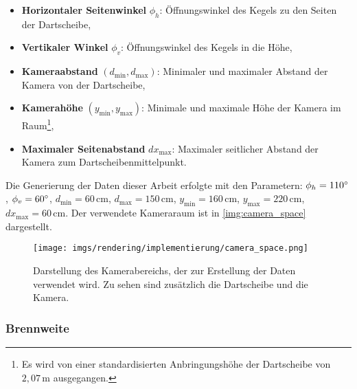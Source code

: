 \begin{itemize}
    \item \textbf{Horizontaler Seitenwinkel} $\phi_h$: Öffnungswinkel des Kegels zu den Seiten der Dartscheibe,
    \item \textbf{Vertikaler Winkel} $\phi_v$: Öffnungswinkel des Kegels in die Höhe,
    \item \textbf{Kameraabstand} $\left(d_\text{min}, d_\text{max}\right)$: Minimaler und maximaler Abstand der Kamera von der Dartscheibe,
    \item \textbf{Kamerahöhe} $\left(y_\text{min}, y_\text{max}\right)$: Minimale und maximale Höhe der Kamera im Raum\footnote{Es wird von einer standardisierten Anbringungshöhe der Dartscheibe von $2,\!07\,\text{m}$ ausgegangen.},
    \item \textbf{Maximaler Seitenabstand} $dx_\text{max}$: Maximaler seitlicher Abstand der Kamera zum Dartscheibenmittelpunkt.
\end{itemize}

Die Generierung der Daten dieser Arbeit erfolgte mit den Parametern: $\phi_h = 110^{\circ}$, $\phi_v = 60^{\circ}$, $d_\text{min} = 60\,\text{cm}$, $d_\text{max} = 150\,\text{cm}$, $y_\text{min} = 160\,\text{cm}$, $y_\text{max} = 220\,\text{cm}$, $dx_\text{max} = 60\,\text{cm}$. Der verwendete Kameraraum ist in \autoref{img:camera_space} dargestellt.

\begin{figure}
    \centering
    \texttt{[image: imgs/rendering/implementierung/camera\_space.png]}
    \caption{Darstellung des Kamerabereichs, der zur Erstellung der Daten verwendet wird. Zu sehen sind zusätzlich die Dartscheibe und die Kamera.}
    \label{img:camera_space}
\end{figure}

\newpage
\subsubsection{Brennweite}
\label{sec:brennweite}

